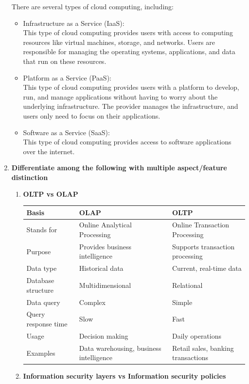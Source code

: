 \documentclass[12pt]{article}
\begin{document}
\begin{enumerate}
There are several types of cloud computing, including:
    \begin{itemize}
        \item Infrastructure as a Service (IaaS):\\ This type of cloud computing provides users with access to computing resources like virtual machines, storage, and networks. Users are responsible for managing the operating systems, applications, and data that run on these resources.
        \item Platform as a Service (PaaS):\\ This type of cloud computing provides users with a platform to develop, run, and manage applications without having to worry about the underlying infrastructure. The provider manages the infrastructure, and users only need to focus on their applications.
        \item Software as a Service (SaaS):\\ This type of cloud computing provides access to software applications over the internet.
    \end{itemize}
    \item{\bfseries Differentiate among the following with multiple aspect/feature distinction}
    \begin{enumerate}
        \item {\bfseries OLTP vs OLAP}
        { \begin{longtable}{ |C{3cm}|L{4.5cm}|L{4.5cm}| }
            \hline
            Basis& OLAP & OLTP \\
            \hline
            Stands for & Online Analytical Processing & Online Transaction Processing \\
            \hline
            Purpose & Provides business intelligence & Supports transaction processing \\
            \hline
            Data type & Historical data & Current, real-time data \\
            \hline
            Database structure & Multidimensional & Relational \\
            \hline
            Data query & Complex & Simple \\
            \hline
            Query response time & Slow & Fast \\
            \hline
            Usage & Decision making & Daily operations \\
            \hline
            Examples & Data warehousing, business intelligence & Retail sales, banking transactions \\
            \hline
            \end{longtable}}
        \item {\bfseries Information security layers vs Information security policies}


\end{enumerate}
\end{enumerate}
\end{document}
